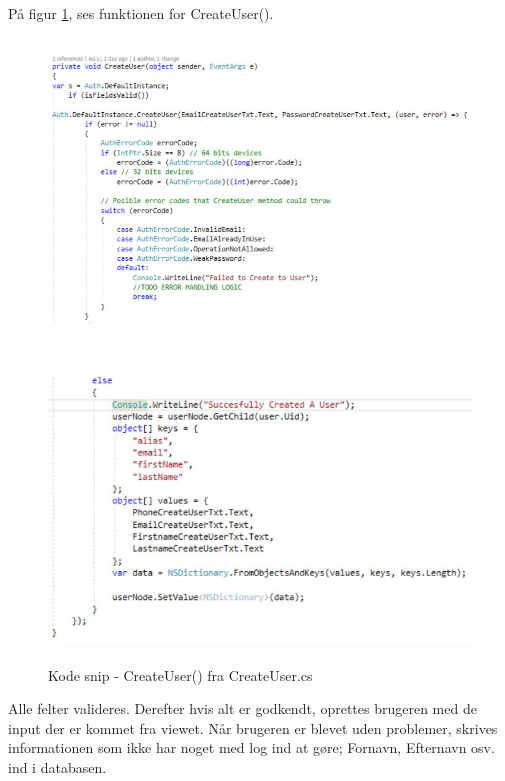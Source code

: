 På figur \ref{fig:CreateUser}, ses funktionen for CreateUser().
\begin{figure}[H] %
	\centering
	\includegraphics[height=8cm, width=17cm]{../ArkitekturDesign/Design/OpretBruger/CreateUser1}
\end{figure}
\begin{figure}[H] %
	\centering
	\includegraphics[height=8cm, width=17cm]{../ArkitekturDesign/Design/OpretBruger/CreateUser2}
	\caption{Kode snip - CreateUser() fra CreateUser.cs}
	\label{fig:CreateUser}
\end{figure}
Alle felter valideres. Derefter hvis alt er godkendt, oprettes brugeren med de input der er kommet fra viewet. Når brugeren er blevet uden problemer, skrives informationen som ikke har noget med log ind at gøre; Fornavn, Efternavn osv. ind i databasen.

\clearpage
